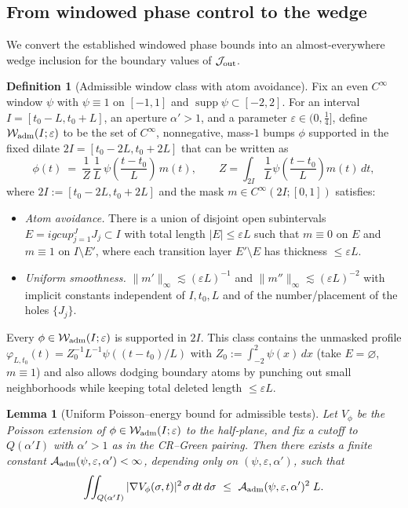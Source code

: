 \documentclass[11pt]{amsart}
\newtheorem{lemma}[theorem]{Lemma}
\theoremstyle{definition}
\newtheorem{definition}[theorem]{Definition}
\theoremstyle{remark}
\begin{document}
\subsection{From windowed phase control to the wedge}

\label{appA:wedge}
We convert the established windowed phase bounds into an almost-everywhere wedge inclusion for the boundary values of $\mathcal J_{\rm out}$.
\begin{definition}[Admissible window class with atom avoidance]\label{def:adm-bumps}
Fix an even \(C^\infty\) window \(\psi\) with \(\psi\equiv1\) on \([-1,1]\) and \(\operatorname{supp}\psi\subset[-2,2]\).
For an interval \(I=[t_0-L,t_0+L]\), an aperture \(\alpha'>1\), and a parameter \(\varepsilon\in(0,\tfrac14]\), define \(\mathcal W_{\rm adm}(I;\varepsilon)\) to be the set of \(C^\infty\), nonnegative, mass-\(1\) bumps \(\phi\) supported in the fixed dilate \(2I=[t_0-2L,t_0+2L]\) that can be written as
\[
  \phi(t)\ =\ \frac{1}{Z}\,\frac{1}{L}\,\psi\!\left(\frac{t-t_0}{L}\right)\,m(t),
  \qquad Z=\int_{2I} \frac1L\psi\!\left(\frac{t-t_0}{L}\right)m(t)\,dt,
\]
where \(2I:=[t_0-2L,t_0+2L]\) and the mask \(m\in C^\infty(2I;[0,1])\) satisfies:
\begin{itemize}
\item[(i)] \emph{Atom avoidance.} There is a union of disjoint open subintervals \(E=igcup_{j=1}^{J} J_j\subset I\) with total length \(|E|\le \varepsilon L\) such that \(m\equiv0\) on \(E\) and \(m\equiv1\) on \(I\setminus E'\), where each transition layer \(E'\setminus E\) has thickness \(\le \varepsilon L\).
\item[(ii)] \emph{Uniform smoothness.} \(\|m'\|_\infty\lesssim (\varepsilon L)^{-1}\) and \(\|m''\|_\infty\lesssim (\varepsilon L)^{-2}\) with implicit constants independent of \(I,t_0,L\) and of the number/placement of the holes \(\{J_j\}\).
\end{itemize}
Every \(\phi\in\mathcal W_{\rm adm}(I;\varepsilon)\) is supported in \(2I\).
This class contains the unmasked profile \(\varphi_{L,t_0}(t)=Z_0^{-1}L^{-1}\psi((t-t_0)/L)\) with \(Z_0:=\int_{-2}^{2}\psi(x)\,dx\) (take \(E=\varnothing\), \(m\equiv1\)) and also allows dodging boundary atoms by punching out small neighborhoods while keeping total deleted length \(\le\varepsilon L\).
\end{definition}
\begin{lemma}[Uniform Poisson--energy bound for admissible tests]\label{lem:uniform-test-energy}
Let \(V_\phi\) be the Poisson extension of \(\phi\in\mathcal W_{\rm adm}(I;\varepsilon)\) to the half‑plane, and fix a cutoff to \(Q(\alpha' I)\) with \(\alpha'>1\) as in the CR--Green pairing.
Then there exists a finite constant \(\mathcal A_{\rm adm}(\psi,\varepsilon,\alpha')<\infty\), depending only on \((\psi,\varepsilon,\alpha')\), such that
\[
  \iint_{Q(\alpha' I)} |\nabla V_\phi(\sigma,t)|^2\,\sigma\,dt\,d\sigma\ \le\ \mathcal A_{\rm adm}(\psi,\varepsilon,\alpha')^2\; L.
\]
\end{lemma}
\end{document}
